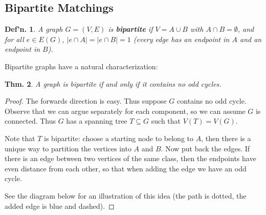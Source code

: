 \documentclass[12pt, a4paper]{book}
\newtheorem{theorem}{Thm.}[section]
\newtheorem{definition}[theorem]{Def'n.}
\theoremstyle{nonumberplain}
\newtheorem{proof}{Proof}
\begin{document}
\subsection{Bipartite Matchings}
\begin{definition}
    A graph $G=(V,E)$ is \textbf{bipartite} if $V=A\cup B$ with $A\cap B=\emptyset$, and for all $e\in E(G)$, $|e\cap A|=|e\cap B|=1$ (every edge has an endpoint in $A$ and an endpoint in $B$).
\end{definition}
Bipartite graphs have a natural characterization:
\begin{theorem}
    A graph is bipartite if and only if it contains no odd cycles.
\end{theorem}
\begin{proof}
    The forwards direction is easy.
    Thus suppose $G$ contains no odd cycle.
    Observe that we can argue separately for each component, so we can assume $G$ is connected.
    Thus $G$ has a spanning tree $T\subseteq G$ such that $V(T)=V(G)$.

    Note that $T$ is bipartite: choose a starting node to belong to $A$, then there is a unique way to partition the vertices into $A$ and $B$.
    Now put back the edges.
    If there is an edge between two vertices of the same class, then the endpoints have even distance from each other, so that when adding the edge we have an odd cycle.

    See the diagram below for an illustration of this idea (the path is dotted, the added edge is blue and dashed).
\end{proof}
\begin{center}
\end{center}
\end{document}
